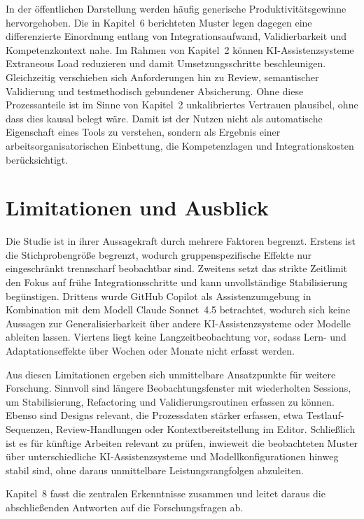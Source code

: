 In der öffentlichen Darstellung werden häufig generische Produktivitätsgewinne hervorgehoben.
Die in Kapitel~6 berichteten Muster legen dagegen eine differenzierte Einordnung entlang von Integrationsaufwand, Validierbarkeit und Kompetenzkontext nahe.
Im Rahmen von Kapitel~2 können KI-Assistenzsysteme Extraneous Load reduzieren und damit Umsetzungsschritte beschleunigen.
Gleichzeitig verschieben sich Anforderungen hin zu Review, semantischer Validierung und testmethodisch gebundener Absicherung.
Ohne diese Prozessanteile ist im Sinne von Kapitel~2 unkalibriertes Vertrauen plausibel, ohne dass dies kausal belegt wäre.
Damit ist der Nutzen nicht als automatische Eigenschaft eines Tools zu verstehen, sondern als Ergebnis einer arbeitsorganisatorischen Einbettung, die Kompetenzlagen und Integrationskosten berücksichtigt.

\section{Limitationen und Ausblick}
\label{sec:discussion_limitations}

Die Studie ist in ihrer Aussagekraft durch mehrere Faktoren begrenzt.
Erstens ist die Stichprobengröße begrenzt, wodurch gruppenspezifische Effekte nur eingeschränkt trennscharf beobachtbar sind.
Zweitens setzt das strikte Zeitlimit den Fokus auf frühe Integrationsschritte und kann unvollständige Stabilisierung begünstigen.
Drittens wurde GitHub Copilot als Assistenzumgebung in Kombination mit dem Modell Claude Sonnet~4.5 betrachtet, wodurch sich keine Aussagen zur Generalisierbarkeit über andere KI-Assistenzsysteme oder Modelle ableiten lassen.
Viertens liegt keine Langzeitbeobachtung vor, sodass Lern- und Adaptationseffekte über Wochen oder Monate nicht erfasst werden.

Aus diesen Limitationen ergeben sich unmittelbare Ansatzpunkte für weitere Forschung.
Sinnvoll sind längere Beobachtungsfenster mit wiederholten Sessions, um Stabilisierung, Refactoring und Validierungsroutinen erfassen zu können.
Ebenso sind Designs relevant, die Prozessdaten stärker erfassen, etwa Testlauf-Sequenzen, Review-Handlungen oder Kontextbereitstellung im Editor.
Schließlich ist es für künftige Arbeiten relevant zu prüfen, inwieweit die beobachteten Muster über unterschiedliche KI-Assistenzsysteme und Modellkonfigurationen hinweg stabil sind, ohne daraus unmittelbare Leistungsrangfolgen abzuleiten.

Kapitel~8 fasst die zentralen Erkenntnisse zusammen und leitet daraus die abschließenden Antworten auf die Forschungsfragen ab.
